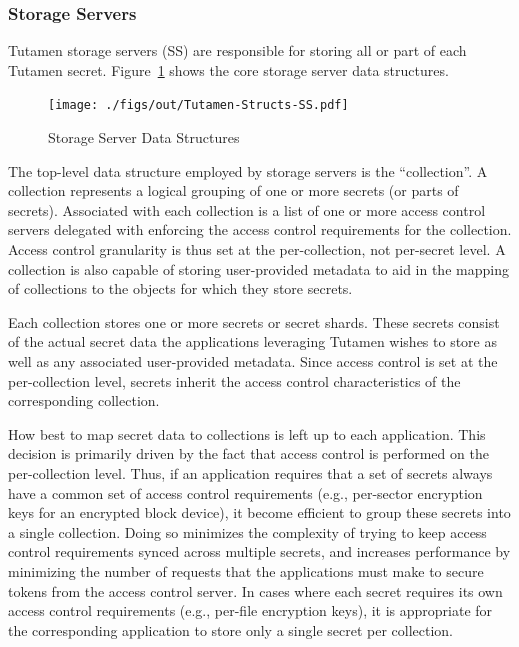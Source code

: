 \subsubsection{Storage Servers}
\label{chap:tutamen:platform:arch:ss}

Tutamen storage servers (SS) are responsible for storing all or part
of each Tutamen secret. Figure~\ref{fig:tutamen:storagestructs} shows
the core storage server data structures.

\begin{figure}[t]
  \centering
  \texttt{[image: ./figs/out/Tutamen-Structs-SS.pdf]}
  \caption{Storage Server Data Structures}
  \label{fig:tutamen:storagestructs}
\end{figure}

The top-level data structure employed by storage servers is the
``collection''. A collection represents a logical grouping of one or
more secrets (or parts of secrets). Associated with each collection is
a list of one or more access control servers delegated with enforcing
the access control requirements for the collection. Access control
granularity is thus set at the per-collection, not per-secret level. A
collection is also capable of storing user-provided metadata to aid in
the mapping of collections to the objects for which they store
secrets.

Each collection stores one or more secrets or secret shards. These
secrets consist of the actual secret data the applications leveraging
Tutamen wishes to store as well as any associated user-provided
metadata. Since access control is set at the per-collection level,
secrets inherit the access control characteristics of the
corresponding collection.

How best to map secret data to collections is left up to each
application. This decision is primarily driven by the fact that access
control is performed on the per-collection level. Thus, if an
application requires that a set of secrets always have a common set of
access control requirements (e.g., per-sector encryption keys for an
encrypted block device), it become efficient to group these secrets
into a single collection. Doing so minimizes the complexity of trying
to keep access control requirements synced across multiple secrets,
and increases performance by minimizing the number of requests that
the applications must make to secure tokens from the access control
server. In cases where each secret requires its own access control
requirements (e.g., per-file encryption keys), it is appropriate for
the corresponding application to store only a single secret per
collection.

